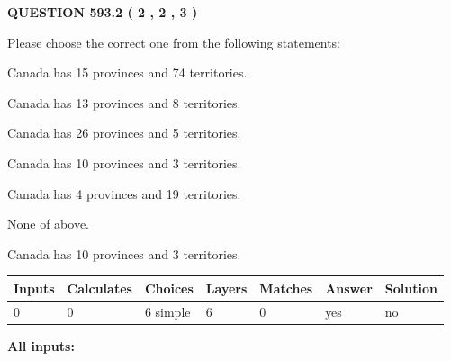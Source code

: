 \documentclass[12pt]{article}
\begin{document}
   
  
\vspace{0.2in}
  
{\textbf{\Large{QUESTION
593.2 
 ( 2 , 2 , 3 )
}}}
  
  
Please choose the correct one from the following statements:
 
 
Canada has  15 provinces and  74 territories.
 
 
Canada has  13 provinces and  8 territories.
 
 
Canada has  26 provinces and  5 territories.
 
 
Canada has 10  provinces and 3 territories.
 
 
Canada has   4 provinces and  19 territories.
 
 
 None of above.
 
 
\noindent{}
 
 
Canada has 10  provinces and 3 territories.
 
 
\noindent{}
 
 
   
   
   
   
\noindent\begin{tabular}{|l|l|l|l|l|l|l|}
 \hline
Inputs & Calculates & Choices & Layers & Matches & Answer & Solution \\ \hline
 0  & 
 0  & 
 6
  simple  
  & 
 6  & 
 0  & 
  yes & 
  no 
  \\ \hline
 \end{tabular}
   
   
   
   
\noindent{}
   
   
   
   
\noindent\vspace{0.1in}\hspace{-0.08in} {\textbf{\Large{All inputs: }}}
   
   
   
   
   
   
 \vspace{0.2in}
 
\end{document}
